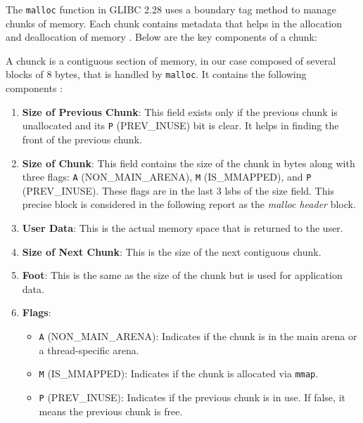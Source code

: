     The \texttt{malloc} function in GLIBC 2.28 uses a boundary tag method to manage chunks of memory. Each chunk contains metadata that helps in the allocation and deallocation of memory \cite{MallocGLIBC2001} \cite{MallocInternalsWiki2023}. Below are the key components of a chunk:

    A chunck is a contiguous section of memory, in our case composed of several blocks of 8 bytes, that is handled by \texttt{malloc}. It contains the following components \cite{MallocInternalsWiki2023} \cite{StackExchangeMalloc2023}:

    \begin{enumerate}
        \item \textbf{Size of Previous Chunk}: This field exists only if the previous chunk is unallocated and its \texttt{P} (PREV\_INUSE) bit is clear. It helps in finding the front of the previous chunk.
        
        \item \textbf{Size of Chunk}: This field contains the size of the chunk in bytes along with three flags: \texttt{A} (NON\_MAIN\_ARENA), \texttt{M} (IS\_MMAPPED), and \texttt{P} (PREV\_INUSE). These flags are in the last 3 \acrshort{lsb}s of the size field. This precise block is considered in the following report as the \textit{malloc header} block.
        
        \item \textbf{User Data}: This is the actual memory space that is returned to the user.
        
        \item \textbf{Size of Next Chunk}: This is the size of the next contiguous chunk.
        
        \item \textbf{Foot}: This is the same as the size of the chunk but is used for application data.
        
        \item \textbf{Flags}:
        \begin{itemize}
            \item \texttt{A} (NON\_MAIN\_ARENA): Indicates if the chunk is in the main arena or a thread-specific arena.
            \item \texttt{M} (IS\_MMAPPED): Indicates if the chunk is allocated via \texttt{mmap}.
            \item \texttt{P} (PREV\_INUSE): Indicates if the previous chunk is in use. If false, it means the previous chunk is free.
        \end{itemize}
    \end{enumerate}

